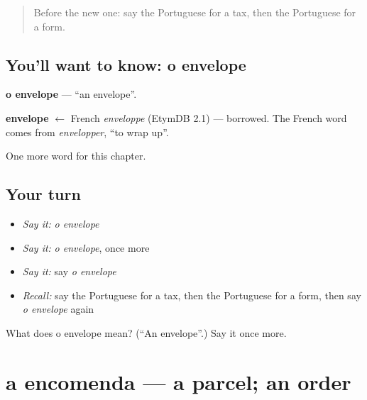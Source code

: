 \label{lesson:PT-C162-envelope}



\begin{quote}
Before the new one: say the Portuguese for a tax, then the Portuguese for a form.
\end{quote}

\subsection*{You'll want to know: o envelope}
\textbf{o envelope} — \textquotedblleft{}an envelope\textquotedblright{}.

\begin{cousinweb}
\textbf{envelope} $\leftarrow$ French \emph{enveloppe} (EtymDB 2.1) — borrowed. The French word comes from \emph{envelopper}, \textquotedblleft{}to wrap up\textquotedblright{}.
\end{cousinweb}

\begin{grammarlens}[title={What you've built}]
One more word for this chapter.
\end{grammarlens}

\subsection*{Your turn}
\begin{itemize}
\raggedright
  \item \emph{Say it:} \emph{o envelope}
  \item \emph{Say it:} \emph{o envelope}, once more
  \item \emph{Say it:} say \emph{o envelope}
  \item \emph{Recall:} say the Portuguese for a tax, then the Portuguese for a form, then say \emph{o envelope} again
\end{itemize}

\begin{tcolorbox}[breakable,colback=teal!4,colframe=teal!35!black,title={Before you move on}]
What does o envelope mean? (\textquotedblleft{}An envelope\textquotedblright{}.) Say it once more.
\end{tcolorbox}
\section[a encomenda]{a encomenda — a parcel; an order}

\label{lesson:PT-C162-encomenda}



